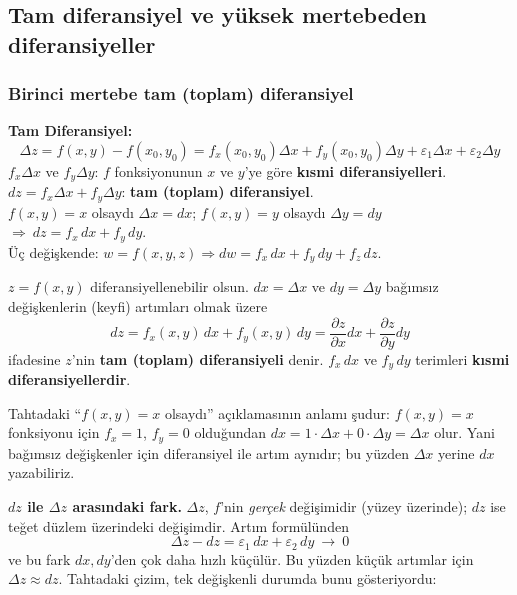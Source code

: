 \subsection{Tam diferansiyel ve yüksek mertebeden diferansiyeller}

\subsubsection{Birinci mertebe tam (toplam) diferansiyel}

\begin{tahta}
\textbf{Tam Diferansiyel:}
\[
\Delta z=f(x,y)-f(x_0,y_0)=f_x(x_0,y_0)\Delta x+f_y(x_0,y_0)\Delta y+\varepsilon_1\Delta x+\varepsilon_2\Delta y
\]
$f_x\Delta x$ ve $f_y\Delta y$: $f$ fonksiyonunun $x$ ve $y$'ye göre \textbf{kısmi diferansiyelleri}.\\
$dz=f_x\Delta x+f_y\Delta y$: \textbf{tam (toplam) diferansiyel}.\\
$f(x,y)=x$ olsaydı $\Delta x=dx$; $f(x,y)=y$ olsaydı $\Delta y=dy$ $\Rightarrow\ dz=f_x\,dx+f_y\,dy$.\\
Üç değişkende: $w=f(x,y,z)\Rightarrow dw=f_x\,dx+f_y\,dy+f_z\,dz$.
\end{tahta}

\begin{tanim}
$z=f(x,y)$ diferansiyellenebilir olsun. $dx=\Delta x$ ve $dy=\Delta y$ bağımsız değişkenlerin (keyfi) artımları olmak
üzere
\[ \boxed{\,dz=f_x(x,y)\,dx+f_y(x,y)\,dy=\frac{\partial z}{\partial x}dx+\frac{\partial z}{\partial y}dy\,} \]
ifadesine $z$'nin \textbf{tam (toplam) diferansiyeli} denir. $f_x\,dx$ ve $f_y\,dy$ terimleri \textbf{kısmi
diferansiyellerdir}.
\end{tanim}

Tahtadaki ``$f(x,y)=x$ olsaydı'' açıklamasının anlamı şudur: $f(x,y)=x$ fonksiyonu için $f_x=1$, $f_y=0$ olduğundan
$dx=1\cdot\Delta x+0\cdot\Delta y=\Delta x$ olur. Yani bağımsız değişkenler için diferansiyel ile artım aynıdır; bu yüzden
$\Delta x$ yerine $dx$ yazabiliriz.

\textbf{$dz$ ile $\Delta z$ arasındaki fark.} $\Delta z$, $f$'nin \emph{gerçek} değişimidir (yüzey üzerinde);
$dz$ ise teğet düzlem üzerindeki değişimdir. Artım formülünden
\[ \Delta z-dz=\varepsilon_1\,dx+\varepsilon_2\,dy\ \longrightarrow\ 0 \]
ve bu fark $dx,dy$'den çok daha hızlı küçülür. Bu yüzden küçük artımlar için $\Delta z\approx dz$. Tahtadaki çizim, tek
değişkenli durumda bunu gösteriyordu:

